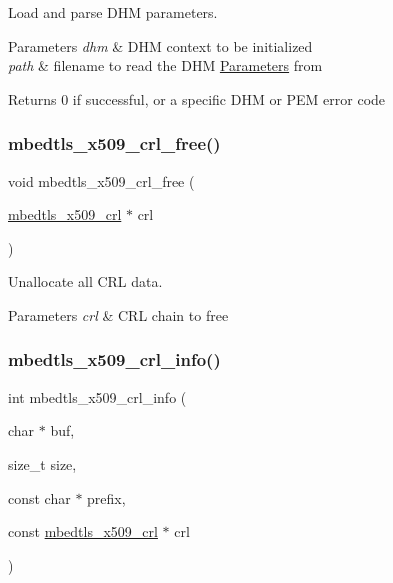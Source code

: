 Load and parse D\+HM parameters. 


\begin{DoxyParams}{Parameters}
{\em dhm} & D\+HM context to be initialized \\
\hline
{\em path} & filename to read the D\+HM \mbox{\hyperlink{struct_parameters}{Parameters}} from\\
\hline
\end{DoxyParams}
\begin{DoxyReturn}{Returns}
0 if successful, or a specific D\+HM or P\+EM error code 
\end{DoxyReturn}
\mbox{\label{group__x509__module_gaeb19c3326889f9e493fbd605c1113b96}} 
\subsubsection{\texorpdfstring{mbedtls\+\_\+x509\+\_\+crl\+\_\+free()}{mbedtls\_x509\_crl\_free()}}
{\footnotesize\ttfamily void mbedtls\+\_\+x509\+\_\+crl\+\_\+free (\begin{DoxyParamCaption}\item[{\mbox{\hyperlink{structmbedtls__x509__crl}{mbedtls\+\_\+x509\+\_\+crl}} $\ast$}]{crl }\end{DoxyParamCaption})}



Unallocate all C\+RL data. 


\begin{DoxyParams}{Parameters}
{\em crl} & C\+RL chain to free \\
\hline
\end{DoxyParams}
\mbox{\label{group__x509__module_ga35898e101f5039c6db6b930da9892366}} 
\subsubsection{\texorpdfstring{mbedtls\+\_\+x509\+\_\+crl\+\_\+info()}{mbedtls\_x509\_crl\_info()}}
{\footnotesize\ttfamily int mbedtls\+\_\+x509\+\_\+crl\+\_\+info (\begin{DoxyParamCaption}\item[{char $\ast$}]{buf,  }\item[{size\+\_\+t}]{size,  }\item[{const char $\ast$}]{prefix,  }\item[{const \mbox{\hyperlink{structmbedtls__x509__crl}{mbedtls\+\_\+x509\+\_\+crl}} $\ast$}]{crl }\end{DoxyParamCaption})}



